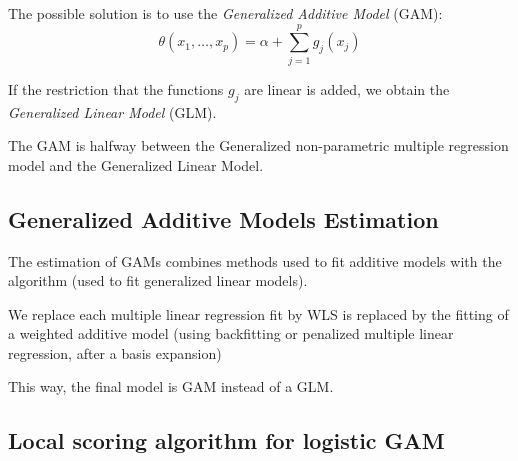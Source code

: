 The possible solution is to use the \emph{Generalized Additive Model} (GAM):
\begin{equation*}
    \theta(x_1,\ldots,x_p) = \alpha + \sum_{j=1}^p g_j(x_j)
\end{equation*}

If the restriction that the functions $g_j$ are linear is added,
we obtain the \emph{Generalized Linear Model} (GLM).

\begin{note}
The GAM is halfway between the Generalized non-parametric multiple regression model
and the Generalized Linear Model.
\end{note}

\subsection{Generalized Additive Models Estimation}

The estimation of GAMs combines methods used to fit additive models with the
 algorithm (used to fit generalized linear models).

We replace each multiple linear regression fit by WLS is replaced
by the fitting of a weighted additive model (using backfitting
or penalized multiple linear regression, after a basis expansion)

This way, the final model is GAM instead of a GLM.

\subsection{Local scoring algorithm for logistic GAM}

